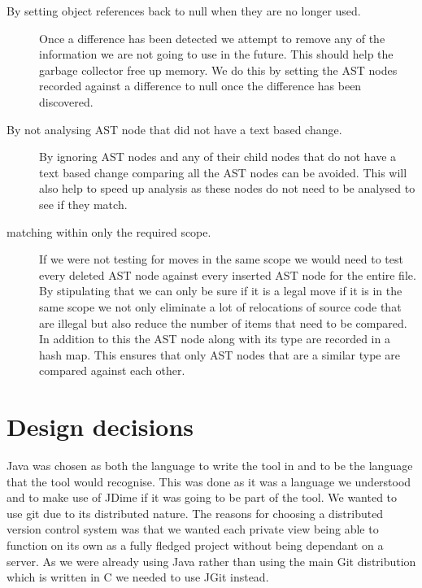 \begin{description}
 \item [By setting object references back to null when they are no longer used.]
  Once a difference has been detected we attempt to remove any of the information we are not going to use in the future.  This should help the garbage collector free up memory. We do this by setting the AST nodes recorded against a difference to null once the difference has been discovered. 
\item [By not analysing AST node that did not have a text based change.] 
  By ignoring AST nodes and any of their child nodes that do not have a text based change comparing all the AST nodes can be avoided.  This will also help to speed up analysis as these nodes do not need to be analysed to see if they match.
\item [matching within only the required scope.]
  If we were not testing for moves in the same scope we would need to test every deleted AST node against every inserted AST node for the entire file. By stipulating that we can only be sure if it is a legal move if it is in the same scope we not only eliminate a lot of relocations of source code that are illegal but also reduce the number of items that need to be compared. In addition to this the AST node along with its type are recorded in a hash map.  This ensures that only AST nodes that are a similar type are compared against each other.
\end{description}


\section{Design decisions}
Java was chosen as both the language to write the tool in and to be the language that the tool would recognise.  This was done as it was a language we understood and to make use of JDime if it was going to be part of the tool.  We wanted to use git due to its distributed nature.  The reasons for choosing a distributed version control system was that we wanted each private view being able to function on its own as a fully fledged project without being dependant on a server.  As we were already using Java rather than using the main Git distribution which is written in C we needed to use JGit instead.

